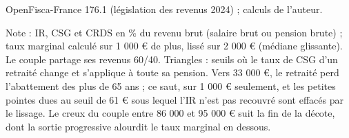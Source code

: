 OpenFisca-France 176.1 (législation des revenus 2024) ; calculs de l'auteur.\par Note : IR, CSG et CRDS en \% du revenu brut (salaire brut ou pension brute) ; taux marginal calculé sur 1 000 \euro{} de plus, lissé sur 2 000 \euro{} (médiane glissante). Le couple partage ses revenus 60/40. Triangles : seuils où le taux de CSG d'un retraité change et s'applique à toute sa pension. Vers 33 000 \euro{}, le retraité perd l'abattement des plus de 65 ans ; ce saut, sur 1 000 \euro{} seulement, et les petites pointes dues au seuil de 61 \euro{} sous lequel l'IR n'est pas recouvré sont effacés par le lissage. Le creux du couple entre 86 000 et 95 000 \euro{} suit la fin de la décote, dont la sortie progressive alourdit le taux marginal en dessous.
